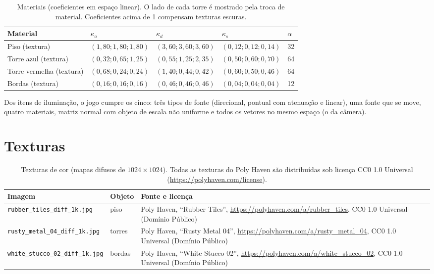 \documentclass[a4paper,11pt]{article}
\newcommand{\arq}[1]{\texttt{#1}}
\begin{document}
\begin{table}[H]
\centering\small
\begin{tabular}{@{}lllll@{}}
\toprule
\textbf{Material} & $\kappa_a$ & $\kappa_d$ & $\kappa_s$ & $\alpha$ \\
\midrule
Piso (textura) & $(1{,}80;1{,}80;1{,}80)$ & $(3{,}60;3{,}60;3{,}60)$ & $(0{,}12;0{,}12;0{,}14)$ & 32 \\
Torre azul (textura) & $(0{,}32;0{,}65;1{,}25)$ & $(0{,}55;1{,}25;2{,}35)$ & $(0{,}50;0{,}60;0{,}70)$ & 64 \\
Torre vermelha (textura) & $(0{,}68;0{,}24;0{,}24)$ & $(1{,}40;0{,}44;0{,}42)$ & $(0{,}60;0{,}50;0{,}46)$ & 64 \\
Bordas (textura) & $(0{,}16;0{,}16;0{,}16)$ & $(0{,}46;0{,}46;0{,}46)$ & $(0{,}04;0{,}04;0{,}04)$ & 12 \\
\bottomrule
\end{tabular}
\caption{Materiais (coeficientes em espaço linear). O lado de cada torre é mostrado pela troca de material. Coeficientes acima de 1 compensam texturas escuras.}
\end{table}

Dos itens de iluminação, o jogo cumpre os cinco: três tipos de fonte (direcional, pontual com atenuação e linear), uma fonte
que se move, quatro materiais, matriz normal com objeto de escala não uniforme e
todos os vetores no mesmo espaço (o da câmera).

\section{Texturas}
\begin{table}[H]
\centering\small
\begin{tabularx}{\linewidth}{@{}llY@{}}
\toprule
\textbf{Imagem} & \textbf{Objeto} & \textbf{Fonte e licença} \\
\midrule
\arq{rubber\_tiles\_diff\_1k.jpg} & piso & Poly Haven, ``Rubber Tiles'', \url{https://polyhaven.com/a/rubber_tiles}, CC0 1.0 Universal (Domínio Público) \\
\arq{rusty\_metal\_04\_diff\_1k.jpg} & torres & Poly Haven, ``Rusty Metal 04'', \url{https://polyhaven.com/a/rusty_metal_04}, CC0 1.0 Universal (Domínio Público) \\
\arq{white\_stucco\_02\_diff\_1k.jpg} & bordas & Poly Haven, ``White Stucco 02'', \url{https://polyhaven.com/a/white_stucco_02}, CC0 1.0 Universal (Domínio Público) \\
\bottomrule
\end{tabularx}
\caption{Texturas de cor (mapas difusos de $1024\times1024$). Todas as texturas do Poly Haven são distribuídas sob licença CC0 1.0 Universal (\url{https://polyhaven.com/license}).}
\end{table}
\end{document}
